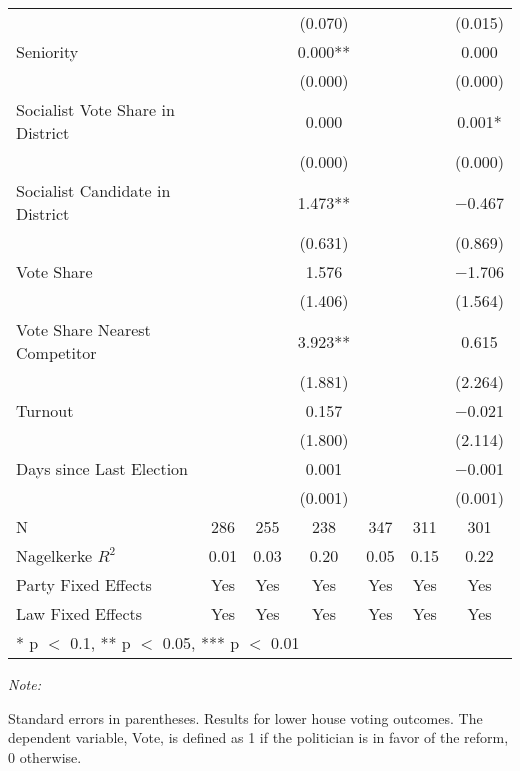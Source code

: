 \begin{table}[!h]
{\begin{threeparttable}
\begin{tabular}[t]{lcccccc}
 &  &  & (\num{0.070}) &  &  & (\num{0.015})\\
Seniority &  &  & \num{0.000}** &  &  & \num{0.000}\\
 &  &  & (\num{0.000}) &  &  & \vphantom{1} (\num{0.000})\\
Socialist Vote Share in District &  &  & \num{0.000} &  &  & \num{0.001}*\\
 &  &  & (\num{0.000}) &  &  & (\num{0.000})\\
Socialist Candidate in District &  &  & \num{1.473}** &  &  & \num{-0.467}\\
 &  &  & (\num{0.631}) &  &  & (\num{0.869})\\
Vote Share &  &  & \num{1.576} &  &  & \num{-1.706}\\
 &  &  & (\num{1.406}) &  &  & (\num{1.564})\\
Vote Share Nearest Competitor &  &  & \num{3.923}** &  &  & \num{0.615}\\
 &  &  & (\num{1.881}) &  &  & (\num{2.264})\\
Turnout &  &  & \num{0.157} &  &  & \num{-0.021}\\
 &  &  & (\num{1.800}) &  &  & (\num{2.114})\\
Days since Last Election &  &  & \num{0.001} &  &  & \num{-0.001}\\
 &  &  & (\num{0.001}) &  &  & (\num{0.001})\\
\midrule
N & \num{286} & \num{255} & \num{238} & \num{347} & \num{311} & \num{301}\\
Nagelkerke $R^2$ & \num{0.01} & \num{0.03} & \num{0.20} & \num{0.05} & \num{0.15} & \num{0.22}\\
Party Fixed Effects & Yes & Yes & Yes & Yes & Yes & Yes\\
Law Fixed Effects & Yes & Yes & Yes & Yes & Yes & Yes\\
\bottomrule
\multicolumn{7}{l}{\rule{0pt}{1em}* p $<$ 0.1, ** p $<$ 0.05, *** p $<$ 0.01}\\
\end{tabular}
\begin{tablenotes}[para]
\item \textit{Note: } 
\item Standard errors in parentheses. Results for lower house voting outcomes. The dependent variable, Vote, is defined as 1 if the politician is in favor of the reform, 0 otherwise.
\end{tablenotes}
\end{threeparttable}}
\end{table}
